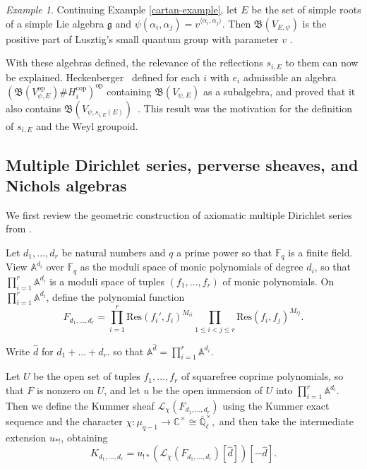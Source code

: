 \documentclass[11pt,letterpaper]{article}
\theoremstyle{definition}
\theoremstyle{remark}
\newtheorem{example}[theorem]{Example}
\numberwithin{equation}{section}
\theoremstyle{dotless}
\newcommand{\hchi}{\psi} %
\newcommand{\Res}{{\mathrm{Res}}}
\begin{document}
\begin{example} Continuing Example \ref{cartan-example}, let $E$ be the set of simple roots of a simple Lie algebra $\mathfrak g$ and $\hchi ( \alpha_i,\alpha_j) = v^{\langle \alpha_i,\alpha_j \rangle}$. Then $\mathfrak{B}(V_{E,\hchi})$ is the positive part of Lusztig's small quantum group with parameter $v$ \cite[Theorem 15.2]{Rosso1998}.\end{example}

With these algebras defined, the relevance of the reflections $s_{i,E}$ to them can now be explained. Heckenberger~\cite[\S4]{HeckenbergerWeyl} defined for each $i$ with $e_i$ admissible an algebra $( \mathfrak{B}(V_{\hchi,E}^{\mathrm{op}}) \# H_i^{\mathrm{cop}})^{\mathrm{op}}$ containing $\mathfrak{B}(V_{\hchi,E})$ as a subalgebra, and proved that it also contains $\mathfrak {B}(V_{\hchi,s_{i,E}(E)})$~\cite[Proposition 1 on p. 180]{HeckenbergerWeyl}. This result was the motivation for the definition of $s_{i,E}$ and the Weyl groupoid.


\subsection{Multiple Dirichlet series, perverse sheaves, and Nichols algebras}\label{ss:connections-cohomology}

We first review the geometric construction of axiomatic multiple Dirichlet series from \cite[\S1]{s-amds}.

Let $d_1,\dots,d_{r}$ be natural numbers and $q$ a prime power so that $\mathbb F_q$ is a finite field. View $\mathbb A^{d_i}$ over $\mathbb F_q$ as the moduli space of monic polynomials of degree $d_i$, so that $\prod_{i=1}^{r} \mathbb A^{d_i} $ is a moduli space of tuples $(f_1,\dots,f_{r})$ of monic polynomials. On $\prod_{i=1}^{r} \mathbb A^{d_i}$, define the polynomial function \[F_{d_1,\dots,d_r}= \prod_{i=1}^r \Res (f_i', f_i) ^{M_{ii} }  \prod_{1\leq i< j \leq r}  \Res(f_i, f_j)^{ M_{ij}}.\]


 Write $\hat{d}$ for $d_1+\dots+d_r$. so that $\mathbb A^{\hat{d}}= \prod_{i=1}^{r} \mathbb A^{d_i}$.

 
Let $U$ be the open set of tuples $f_1,\dots, f_r$ of squarefree coprime polynomials, so that $F$ is nonzero on $U$, and let $u$ be the open immersion of $U$ into $\prod_{i=1}^{r} \mathbb A^{d_i} $. Then we define the Kummer sheaf $\mathcal L_\chi( F_{d_1,\dots,d_r})$ using the Kummer exact sequence and the character $\chi \colon \mu_{q-1} \to \mathbb C^\times \cong \overline{\mathbb Q}_\ell^\times,$ and then take the intermediate extension $u_{*!}$, obtaining
\[ K_{d_1,\dots,d_r} = u_{!*} (\mathcal L_\chi(F_{d_1,\dots,d_r}) [\hat{d}]) [-\hat{d}].\]
\end{document}
